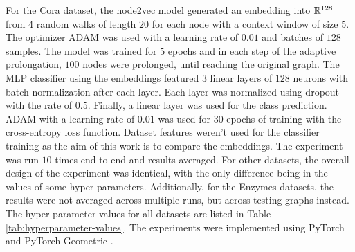 For the Cora dataset, the node2vec model generated an embedding into \( \mathbb{R}^{128} \) from \( 4 \) random walks of length \( 20 \) for each node with a context window of size \( 5 \). The optimizer ADAM \cite{kingma_adam:_2017} was used with a learning rate of \( 0.01 \) and batches of \( 128 \) samples. The model was trained for \( 5 \) epochs and in each step of the adaptive prolongation, \( 100 \) nodes were prolonged, until reaching the original graph. The MLP classifier using the embeddings featured \( 3 \) linear layers of \( 128 \) neurons with batch normalization after each layer. Each layer was normalized using dropout \cite{srivastava_dropout_2014} with the rate of \( 0.5 \). Finally, a linear layer was used for the class prediction. ADAM with a learning rate of \( 0.01 \)  was used for \( 30 \) epochs of training with the cross-entropy loss function. Dataset features weren't used for the classifier training as the aim of this work is to compare the embeddings. The experiment was run \( 10 \) times end-to-end and results averaged. For other datasets, the overall design of the experiment was identical, with the only difference being in the values of some hyper-parameters. Additionally, for the Enzymes datasets, the results were not averaged across multiple runs, but across testing graphs instead. The hyper-parameter values for all datasets are listed in Table \ref{tab:hyperparameter-values}. The experiments were implemented using PyTorch \cite{paszke_pytorch_2019} and PyTorch Geometric \cite{fey_fast_2019}.

